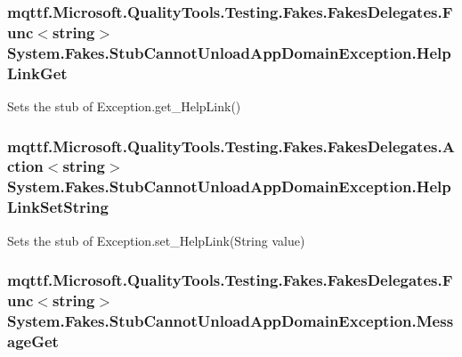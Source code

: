 \hypertarget{class_system_1_1_fakes_1_1_stub_cannot_unload_app_domain_exception_a0822065da63799138d05b1af36fb0250}{
\subsubsection[{Help\-Link\-Get}]{\setlength{\rightskip}{0pt plus 5cm}mqttf.\-Microsoft.\-Quality\-Tools.\-Testing.\-Fakes.\-Fakes\-Delegates.\-Func$<$string$>$ System.\-Fakes.\-Stub\-Cannot\-Unload\-App\-Domain\-Exception.\-Help\-Link\-Get}}\label{class_system_1_1_fakes_1_1_stub_cannot_unload_app_domain_exception_a0822065da63799138d05b1af36fb0250}


Sets the stub of Exception.\-get\-\_\-\-Help\-Link()

\hypertarget{class_system_1_1_fakes_1_1_stub_cannot_unload_app_domain_exception_ab23af0a99bc5e9f41cc41d08b371ccdb}{
\subsubsection[{Help\-Link\-Set\-String}]{\setlength{\rightskip}{0pt plus 5cm}mqttf.\-Microsoft.\-Quality\-Tools.\-Testing.\-Fakes.\-Fakes\-Delegates.\-Action$<$string$>$ System.\-Fakes.\-Stub\-Cannot\-Unload\-App\-Domain\-Exception.\-Help\-Link\-Set\-String}}\label{class_system_1_1_fakes_1_1_stub_cannot_unload_app_domain_exception_ab23af0a99bc5e9f41cc41d08b371ccdb}


Sets the stub of Exception.\-set\-\_\-\-Help\-Link(\-String value)

\hypertarget{class_system_1_1_fakes_1_1_stub_cannot_unload_app_domain_exception_a3cbb5d4c5eebcac1533f5ed146ca541a}{
\subsubsection[{Message\-Get}]{\setlength{\rightskip}{0pt plus 5cm}mqttf.\-Microsoft.\-Quality\-Tools.\-Testing.\-Fakes.\-Fakes\-Delegates.\-Func$<$string$>$ System.\-Fakes.\-Stub\-Cannot\-Unload\-App\-Domain\-Exception.\-Message\-Get}}\label{class_system_1_1_fakes_1_1_stub_cannot_unload_app_domain_exception_a3cbb5d4c5eebcac1533f5ed146ca541a}


